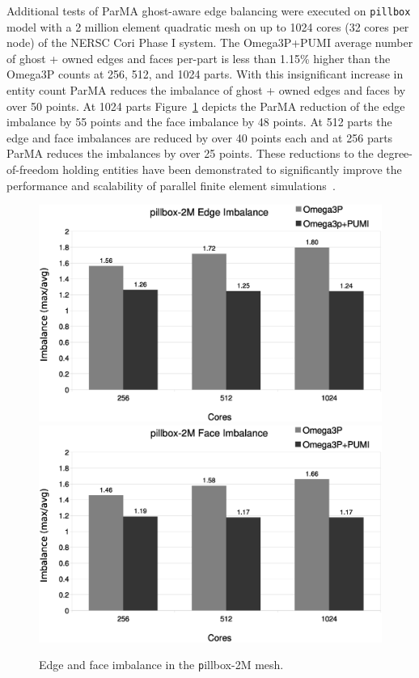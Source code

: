 \documentclass[a4paper]{article}
\begin{document}
Additional tests of ParMA ghost-aware edge balancing were executed on
\texttt{pillbox} model with a 2 million element quadratic mesh on up to 1024
cores (32 cores per node) of the NERSC Cori Phase I system.
The Omega3P+PUMI average number of ghost + owned edges and faces per-part
is less than 1.15\% higher than the Omega3P counts at 256, 512, and 1024 parts.
With this insignificant increase in entity count ParMA reduces the imbalance of 
ghost + owned edges and faces by over 50 points.
At 1024 parts Figure~\ref{fig:pillboximb} depicts the ParMA reduction of the
edge imbalance by 55 points and the face imbalance by 48 points.
At 512 parts the edge and face imbalances are reduced by over 40 points each and
at 256 parts ParMA reduces the imbalances by over 25 points.
These reductions to the degree-of-freedom holding entities have been
demonstrated to significantly improve the performance and scalability of
parallel finite element simulations~\cite{zhou2012unstructured,rasquinCise2014}.

\begin{figure}[ht]
\centering
  \includegraphics[width=\textwidth]{pillbox2M-edge-imb.eps} \\
  \includegraphics[width=\textwidth]{pillbox2M-face-imb.eps} \\
  \caption{\label{fig:pillboximb} Edge and face imbalance in the {\texttt
  pillbox-2M}
  mesh.}
\end{figure}
\end{document}
